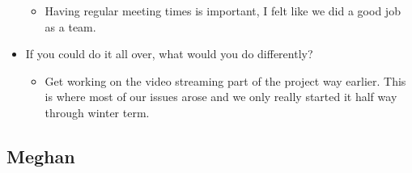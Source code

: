 \documentclass[onecolumn, draftclsnofoot,10pt, compsoc]{IEEEtran}
\begin{document}
\begin{itemize}
        \begin{itemize}
            \item Having regular meeting times is important, I felt like we did a good job as a team.
        \end{itemize}
        \item If you could do it all over, what would you do differently?
        \begin{itemize}
            \item Get working on the video streaming part of the project way earlier. This is where most of our issues arose and we only really started it half way through winter term.
        \end{itemize}
    \end{itemize}
    
    \subsection{Meghan}
\end{document}
